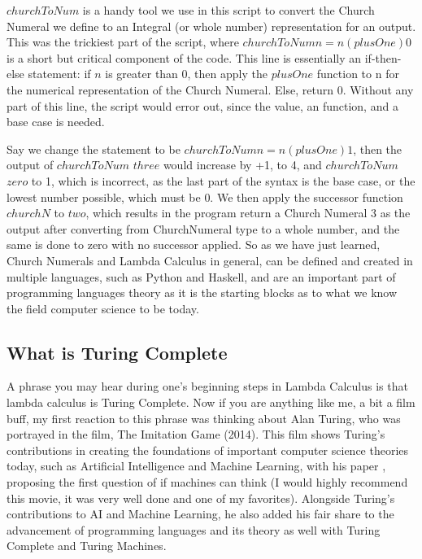 \documentclass{article}
\begin{document}
\medskip\noindent
$churchToNum$ is a handy tool we use in this script to convert the Church Numeral we define to an Integral (or whole number) representation for an output. This was the trickiest part of the script, where $churchToNum n = n (plusOne) 0$ is a short but critical component of the code. This line is essentially an if-then-else statement: if $n$ is greater than 0, then apply the $plusOne$ function to n for the numerical representation of the Church Numeral. Else, return 0. Without any part of this line, the script would error out, since the value, an function, and a base case is needed. 

\medskip\noindent
Say we change the statement to be $churchToNum n = n (plusOne) 1$, then the output of $churchToNum$ $three$ would increase by +1, to 4, and $churchToNum$ $zero$ to 1, which is incorrect, as the last part of the syntax is the base case, or the lowest number possible, which must be 0. We then apply the successor function $churchN$ to $two$, which results in the program return a Church Numeral 3 as the output after converting from ChurchNumeral type to a whole number, and the same is done to zero with no successor applied. So as we have just learned, Church Numerals and Lambda Calculus in general, can be defined and created in multiple languages, such as Python and Haskell, and are an important part of programming languages theory as it is the starting blocks as to what we know the field computer science to be today.

\subsection{What is Turing Complete}
A phrase you may hear during one's beginning steps in Lambda Calculus is that lambda calculus is Turing Complete. Now if you are anything like me, a bit a film buff, my first reaction to this phrase was thinking about Alan Turing, who was portrayed in the film, The Imitation Game (2014). This film shows Turing's contributions in creating the foundations of important computer science theories today, such as Artificial Intelligence and Machine Learning, with his paper \cite{Computing Machinery and Intelligence}, proposing the first question of if machines can think (I would highly recommend this movie, it was very well done and one of my favorites). Alongside  Turing's contributions to AI and Machine Learning, he also added his fair share to the advancement of programming languages and its theory as well with  Turing Complete and Turing Machines. 
\end{document}
